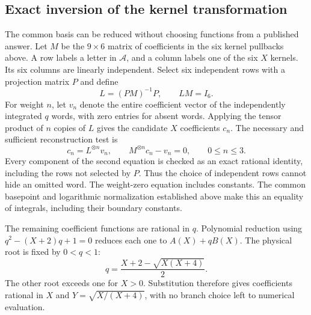 \subsection{Exact inversion of the kernel transformation}
The common basis can be reduced without choosing functions from a
published answer. Let $M$ be the $9\times6$ matrix of coefficients
in the six kernel pullbacks above. A row labels a letter in
$\mathcal A$, and a column labels one of the six $X$ kernels. Its
six columns are linearly independent. Select six independent rows
with a projection matrix $P$ and define
\begin{equation}
 L=(PM)^{-1}P,\qquad LM=I_6.
\end{equation}
For weight $n$, let $v_n$ denote the entire coefficient vector of
the independently integrated $q$ words, with zero entries for absent
words. Applying the tensor product of $n$ copies of $L$ gives the
candidate $X$ coefficients $c_n$. The necessary and sufficient
reconstruction test is
\begin{equation}
 c_n=L^{\otimes n}v_n,\qquad
 M^{\otimes n}c_n-v_n=0,\qquad 0\leq n\leq3.
\end{equation}
Every component of the second equation is checked as an exact
rational identity, including the rows not selected by $P$. Thus the
choice of independent rows cannot hide an omitted word. The
weight-zero equation includes constants. The common basepoint and
logarithmic normalization established above make this an equality
of integrals, including their boundary constants.

The remaining coefficient functions are rational in $q$. Polynomial
reduction using $q^2-(X+2)q+1=0$ reduces each one to $A(X)+qB(X)$.
The physical root is fixed by $0<q<1$:
\begin{equation}
 q=\frac{X+2-\sqrt{X(X+4)}}2.
\end{equation}
The other root exceeds one for $X>0$. Substitution therefore gives
coefficients rational in $X$ and $Y=\sqrt{X/(X+4)}$, with no branch
choice left to numerical evaluation.

